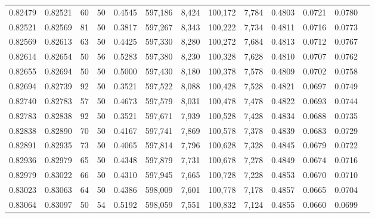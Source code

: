 \begin{tabular}{rrrrrrrrrrrrr}
0.82479 & 0.82521 &    60 &  50 &                                     0.4545 & 597,186 &   8,424 & 100,172 &   7,784 & 0.4803 & 0.0721 & 0.0780 \\
0.82521 & 0.82569 &    81 &  50 &                                     0.3817 & 597,267 &   8,343 & 100,222 &   7,734 & 0.4811 & 0.0716 & 0.0773 \\
0.82569 & 0.82613 &    63 &  50 &                                     0.4425 & 597,330 &   8,280 & 100,272 &   7,684 & 0.4813 & 0.0712 & 0.0767 \\
0.82614 & 0.82654 &    50 &  56 &                                     0.5283 & 597,380 &   8,230 & 100,328 &   7,628 & 0.4810 & 0.0707 & 0.0762 \\
0.82655 & 0.82694 &    50 &  50 &                                     0.5000 & 597,430 &   8,180 & 100,378 &   7,578 & 0.4809 & 0.0702 & 0.0758 \\
0.82694 & 0.82739 &    92 &  50 &                                     0.3521 & 597,522 &   8,088 & 100,428 &   7,528 & 0.4821 & 0.0697 & 0.0749 \\
0.82740 & 0.82783 &    57 &  50 &                                     0.4673 & 597,579 &   8,031 & 100,478 &   7,478 & 0.4822 & 0.0693 & 0.0744 \\
0.82783 & 0.82838 &    92 &  50 &                                     0.3521 & 597,671 &   7,939 & 100,528 &   7,428 & 0.4834 & 0.0688 & 0.0735 \\
0.82838 & 0.82890 &    70 &  50 &                                     0.4167 & 597,741 &   7,869 & 100,578 &   7,378 & 0.4839 & 0.0683 & 0.0729 \\
0.82891 & 0.82935 &    73 &  50 &                                     0.4065 & 597,814 &   7,796 & 100,628 &   7,328 & 0.4845 & 0.0679 & 0.0722 \\
0.82936 & 0.82979 &    65 &  50 &                                     0.4348 & 597,879 &   7,731 & 100,678 &   7,278 & 0.4849 & 0.0674 & 0.0716 \\
0.82979 & 0.83022 &    66 &  50 &                                     0.4310 & 597,945 &   7,665 & 100,728 &   7,228 & 0.4853 & 0.0670 & 0.0710 \\
0.83023 & 0.83063 &    64 &  50 &                                     0.4386 & 598,009 &   7,601 & 100,778 &   7,178 & 0.4857 & 0.0665 & 0.0704 \\
0.83064 & 0.83097 &    50 &  54 &                                     0.5192 & 598,059 &   7,551 & 100,832 &   7,124 & 0.4855 & 0.0660 & 0.0699 \\

\end{tabular}
